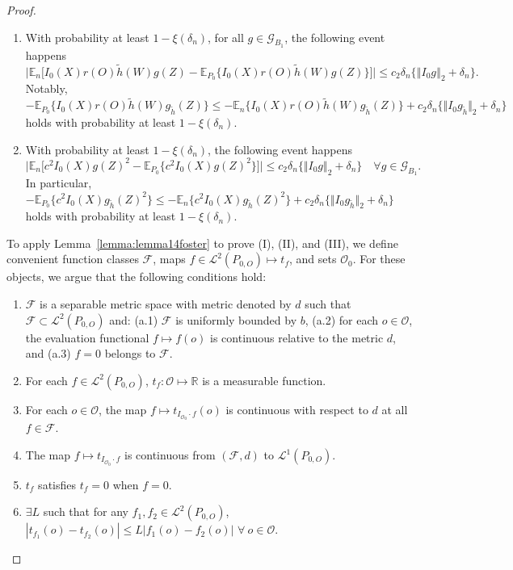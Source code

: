 \documentclass[twoside,11pt]{article}
\newcommand{\E}{\mathbb{E}}
\newcommand{\mc}{\mathcal}
\begin{document}
\begin{proof}
\begin{enumerate}
\item[II.] With probability at least $1-\xi(\delta_n)$, for all $g \in \mc{G}_{B_1}$, the following event happens
\begin{equation}
    \Big\vert \E_n\big[I_0(X)r(O)\tilde h(W)g(Z) - \E_{P_0}\{I_0(X)r(O)\tilde h(W)g(Z)\} \big]\Big \vert \le c_2\delta_n\{\left\Vert I_0g\right\Vert_2+\delta_n\}. \label{eq:term2sup}
\end{equation}
Notably, $-\E_{P_0}\{I_0(X)r(O)\tilde h(W)g_{\tilde h}(Z)\}\le -\E_n\{I_0(X)r(O)\tilde h(W)g_{\tilde h}(Z)\}+ c_2\delta_n\{\Vert I_0g_{\tilde h}\Vert_2+\delta_n\}$ holds with probability at least $1-\xi(\delta_n)$.
\item[III.]  With probability at least $1-\xi(\delta_n)$, the following event happens
\begin{equation}
    \Big\vert \E_n\big[c^2 I_0(X)g(Z)^2 - \E_{P_0}\{c^2 I_0(X)g(Z)^2\} \big]\Big \vert \le c_2\delta_n\{\Vert I_0g\Vert_2+\delta_n\} \quad \forall {g \in \mc{G}_{B_1}}. \label{eq:term3sup}
\end{equation}
In particular, $ -\E_{P_0}\{c^2 I_0(X)g_{\tilde h}(Z)^2\}\le -\E_n\{c^2 I_0(X)g_{\tilde h}(Z)^2\}+ c_2\delta_n\{\Vert I_0g_{\tilde h}\Vert_2+\delta_n\}$ holds with probability at least $1-\xi(\delta_n)$.
\end{enumerate}

To apply Lemma~\ref{lemma:lemma14foster} to prove (I), (II), and (III), we define convenient function classes $\mc{F}$, maps $f \in \mc{L}^2(P_{0,O})\mapsto t_f$, and sets $\mc{O}_0$. For these objects, we argue that the following conditions hold:

 \begin{enumerate}
    \item[a.] $\mc{F}$ is a separable metric space with metric denoted by $d$ such that $\mc{F}\subset\mc{L}^2(P_{0,O})$ and: (a.1) $\mc{F}$ is uniformly bounded by $b$, (a.2) for each $o\in\mc{O}$, the evaluation functional $f\mapsto f(o)$ is continuous relative to the metric $d$, and (a.3) $f=0$ belongs to $\mc{F}$.
    \item[b.] For each $f\in\mc{L}^2(P_{0,O})$, $t_f:\mc{O}\mapsto\mathbb{R}$ is a measurable function.
    \item[c.] For each $o\in\mc{O}$, the map $f\mapsto t_{I_{\mc{O}_0}\cdot f}(o)$ is continuous with respect to $d$ at all $f \in \mc{F}$.
    \item[d.] The map $f\mapsto t_{I_{\mc{O}_0}\cdot f}$ is continuous from $(\mc{F},d)$ to $\mc{L}^1(P_{0,O})$. 
    \item[e.] $t_f$ satisfies $t_f=0$ when $f=0$.
    \item[f.] $\exists L$ such that for any $f_1,f_2\in\mc{L}^2(P_{0,O})$, $|t_{f_1}(o)-t_{f_2}(o)|\le L\left\vert f_1(o)-f_2(o)\right\vert$ $\forall\:o\in\mc{O}$.
\end{enumerate}


\end{proof}
\end{document}
